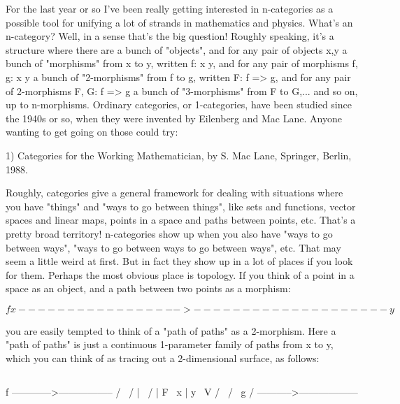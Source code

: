 

For the last year or so I've been really getting interested in
n-categories as a possible tool for unifying a lot of strands
in mathematics and physics.  What's an n-category?  Well, in a
sense that's the big question!  Roughly speaking, it's a structure
where there are a bunch of "objects", and for any pair of objects x,y 
a bunch of "morphisms" from x to y, written f: x \to  y, and for
any pair of morphisms f, g: x \to  y a bunch of "2-morphisms"
from f to g, written F: f => g, and for any pair of 2-morphisms
F, G: f => g a bunch of "3-morphisms" from F to G,... and so on,
up to n-morphisms.  Ordinary categories, or 1-categories, have
been studied since the 1940s or so, when they were invented by 
Eilenberg and Mac Lane.  Anyone wanting to get going on those could try:

1) Categories for the Working Mathematician, by S. Mac Lane,
Springer, Berlin, 1988.

Roughly, categories give a general framework for
dealing with situations where you have "things" and "ways to
go between things", like sets and functions, vector spaces
and linear maps, points in a space and paths between points, etc.
That's a pretty broad territory!  n-categories show up when you
also have "ways to go between ways", "ways to go between ways
to go between ways", etc.  That may seem a little weird at first.
But in fact they show up in a lot of places if you look for them.
Perhaps the most obvious place is topology.  If you think of a
point in a space as an object, and a path between two points as
a morphism:



$$

                            f
         x ----------------->-------------------- y
$$
    
you are easily tempted to think of a "path of paths" as a 2-morphism.
Here a "path of paths" is just a continuous 1-parameter family of
paths from x to y, which you can think of as tracing out a 2-dimensional
surface, as follows:


$$

                          f
             ------------>-----------------
           /                                \
          /              |                   \
         /               | F                  \
        x                |                     y
         \               V                    /
          \                                  /
           \             g                  /
             ----------->------------------  

